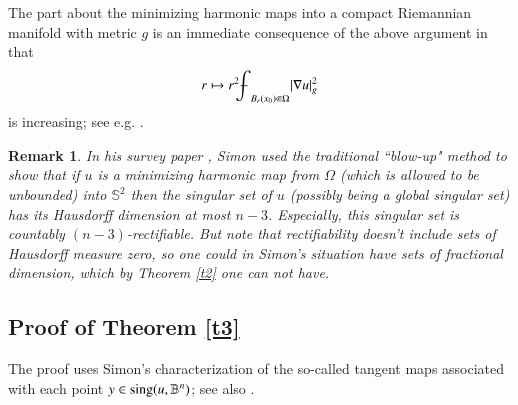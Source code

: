 \documentclass[12pt]{amsart}
\newtheorem{remark}[theorem]{Remark}
\begin{document}
The part about the minimizing harmonic maps into a compact Riemannian manifold with metric $g$ is an immediate consequence of the above argument in that
$$
r\mapsto r^{2}{{\mathchoice
{{{\setbox0=\hbox{$\displaystyle{\textstyle{-}}{\int}$ }
\vcenter{\hbox{$\textstyle{-}$ }}\kern-.6\wd0}}}{{{\setbox0=\hbox{$\textstyle{\scriptstyle{-}}{\int}$ }
\vcenter{\hbox{$\scriptstyle{-}$ }}\kern-.6\wd0}}}{{{\setbox0=\hbox{$\scriptstyle{\scriptscriptstyle{-}}{\int}$ }
\vcenter{\hbox{$\scriptscriptstyle{-}$ }}\kern-.6\wd0}}}{{{\setbox0=\hbox{$\scriptscriptstyle{\scriptscriptstyle{-}}{\int}$ }
\vcenter{\hbox{$\scriptscriptstyle{-}$ }}\kern-.6\wd0}}}\!\int}}_{B_r(x_0)\Subset\Omega}|\nabla u|_g^2
$$
is increasing; see e.g. \cite{LS1996, LW2008}.

\begin{remark} In his survey paper \cite{LS1996}, Simon used the traditional ``blow-up" method
to show that if $u$ is a minimizing harmonic map from $\Omega$
(which is allowed to be unbounded) into $\mathbb S^2$ then the singular set of $u$ (possibly being a global singular set) has its Hausdorff dimension at most $n-3$. Especially, this singular set is
countably $(n-3)$-rectifiable. But note that rectifiability doesn't
include sets of Hausdorff measure zero, so one could in Simon's
situation have sets of fractional dimension, which by Theorem \ref{t2} one can not have.
\end{remark}

\subsection{Proof of Theorem \ref{t3}} The proof uses Simon's characterization of the so-called tangent maps associated with each point $y\in\hbox{sing}(u,\mathbb B^n)$; see also \cite{LS1996}.
\end{document}
